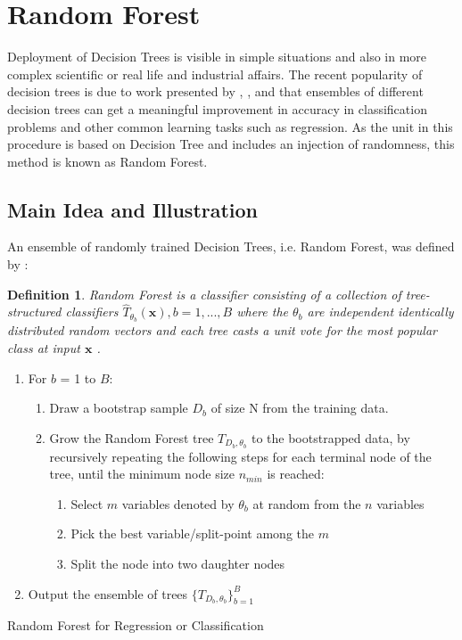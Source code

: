\pagebreak
\section{Random Forest}
Deployment of Decision Trees is visible in simple situations and also in more complex scientific or real life and industrial affairs.
The recent popularity of decision trees is due to work presented by 
\cite{Breiman1996OUT-OF-BAG-E}, \cite{breiman2001random}, and \cite{breiman2004consistency} that ensembles of 
different decision trees can get a meaningful improvement in accuracy in classification problems and other 
common learning tasks such as regression. As the unit in this procedure is based on Decision Tree and includes an injection of
randomness, this method is known as Random Forest. 

\subsection{Main Idea and Illustration}
An ensemble of randomly trained Decision Trees, i.e. Random Forest, was defined by \cite{breiman2001random}:

\newtheorem{definition}{Definition}
\begin{definition}
	Random Forest is a classifier consisting of a collection of tree-structured classifiers ${\hat{T}_{\theta_{b}}(\textbf{x})}, b = 1,...,B$ where the $\theta_{b}$ are independent identically
	distributed random vectors and each tree casts a unit vote for the most popular class at input $\textbf{x}$ .
\end{definition}

\begin{algorithm}[H]
\SetAlgoLined
\begin{enumerate}
	\item For $b$ = 1 to $B$:
	\begin{enumerate}
	    \item Draw a bootstrap sample $D_{b}$ of size N from the training data.
	    \item Grow the Random Forest tree ${{T}_{D_{b},\theta_{b}}}$ to the bootstrapped data, by recursively repeating the following steps for each terminal node of the tree, until the minimum node size $n_{min}$ is reached:
	    \begin{enumerate}
	       \item Select $m$ variables denoted by $\theta_{b}$ at random from the $n$ variables
	       \item Pick the best variable/split-point among the $m$
	       \item  Split the node into two daughter nodes
	    \end{enumerate}
	\end{enumerate}
	\item  Output the ensemble of trees $\{{T}_{D_{b},\theta_{b}}\}_{b=1}^{B}$
\end{enumerate}
 \caption{Random Forest for Regression or Classification \cite{friedman2001elements}}
\end{algorithm}

